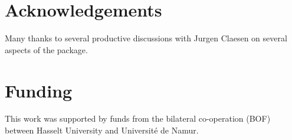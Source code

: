 \documentclass[a4paper,12pt]{extarticle}
\begin{document}
\section*{Acknowledgements}
Many thanks to several productive discussions with Jurgen Claesen on several aspects of the package.

\section*{Funding}
This work was supported by funds from the bilateral co-operation (BOF) between Hasselt University and Universit\'{e} de Namur.\vspace*{-12pt}



	










\end{document}
